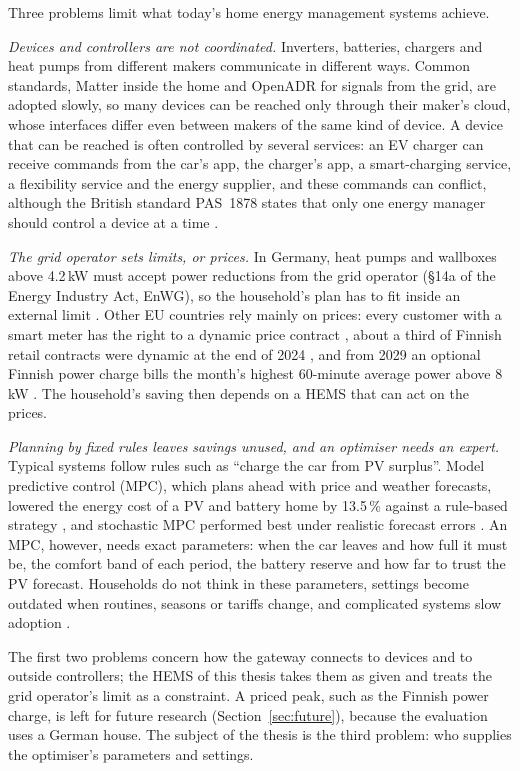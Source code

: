 Three problems limit what today's home energy management systems
achieve.

\textit{Devices and controllers are not coordinated.} Inverters,
batteries, chargers and heat pumps from different makers communicate in
different ways. Common standards, Matter inside the home and OpenADR for
signals from the grid, are adopted slowly, so many devices can be
reached only through their maker's cloud, whose interfaces differ even
between makers of the same kind of device. A device that can be reached
is often controlled by several services: an EV charger can receive
commands from the car's app, the charger's app, a smart-charging
service, a flexibility service and the energy supplier, and these
commands can conflict, although the British standard PAS~1878 states
that only one energy manager should control a device at a time
\parencite{catapult2026}.

\textit{The grid operator sets limits, or prices.} In Germany, heat
pumps and wallboxes above 4.2\,kW must accept power
reductions from the grid operator (§14a of the Energy Industry Act,
EnWG), so the household's plan has to fit inside an external limit
\parencite{evcc14a}. Other EU countries rely mainly on prices: every
customer with a smart meter has the right to a dynamic price contract
\parencite{eudir2019}, about a third of Finnish retail contracts were
dynamic at the end of 2024 \parencite{energyauthority2025}, and from
2029 an optional Finnish power charge bills the month's highest
60-minute average power above 8\,kW \parencite{energyauthority2026}. The
household's saving then depends on a HEMS that can act on the prices.

\textit{Planning by fixed rules leaves savings unused, and an optimiser
needs an expert.} Typical systems follow rules such as ``charge the car
from PV surplus''. Model predictive control (MPC), which plans ahead
with price and weather forecasts, lowered the energy cost of a PV and
battery home by 13.5\,\% against a rule-based strategy
\parencite{seal2019}, and stochastic MPC performed best under realistic
forecast errors \parencite{blonsky2022}. An MPC, however, needs exact
parameters: when the car leaves and how full it must be, the comfort
band of each period, the battery reserve and how far to trust the PV
forecast. Households do not think in these parameters, settings become
outdated when routines, seasons or tariffs change, and complicated
systems slow adoption \parencite{tuomela2021}.

The first two problems concern how the gateway connects to devices and
to outside controllers; the HEMS of this thesis takes them as given and
treats the grid operator's limit as a constraint. A priced peak, such as
the Finnish power charge, is left for future research
(Section~\ref{sec:future}), because the evaluation uses a German house.
The subject of the thesis is the third problem: who supplies the
optimiser's parameters and settings.

